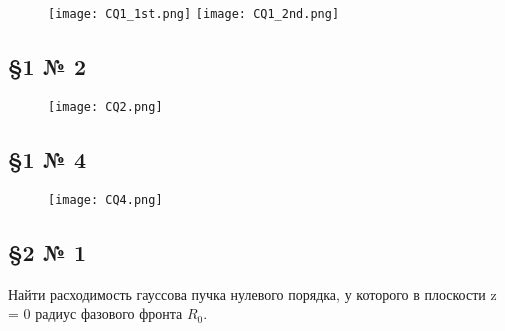 \documentclass[a4paper,12pt]{article}
\begin{document}
\begin{figure}[h!]
    \centering
    \texttt{[image: CQ1\_1st.png]}
    \texttt{[image: CQ1\_2nd.png]}
    \label{fig2:wit lense}
\end{figure}

\pagebreak


\subsection*{\S 1 № 2}

\begin{figure}[h!]
    \centering
    \texttt{[image: CQ2.png]}
    \label{fig2:wit lense}
\end{figure}

\subsection*{\S 1 № 4}

\begin{figure}[h!]
    \centering
    \texttt{[image: CQ4.png]}
    \label{fig2:wit lense}
\end{figure}

\pagebreak

\subsection*{\S 2 № 1}

Найти расходимость гауссова пучка нулевого порядка, у которого в плоскости z = 0 радиус фазового фронта $R_0$.

    
\end{document}
